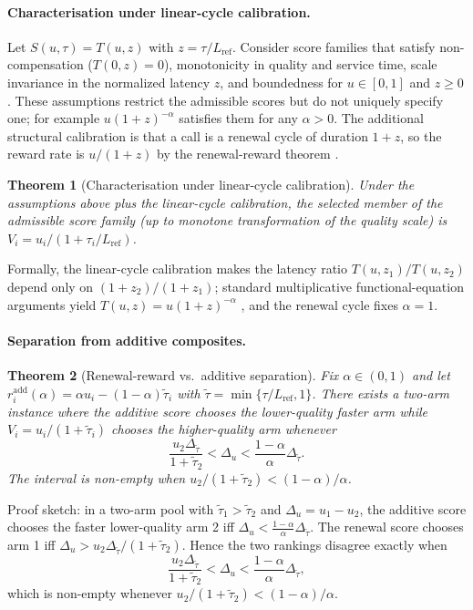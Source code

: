 \documentclass[11pt]{article}
\newtheorem{theorem}{Theorem}
\begin{document}
\paragraph{Characterisation under linear-cycle calibration.} Let $S(u,\tau)=T(u,z)$ with $z=\tau/L_{\text{ref}}$. Consider score families that satisfy non-compensation ($T(0,z)=0$), monotonicity in quality and service time, scale invariance in the normalized latency $z$, and boundedness for $u\in[0,1]$ and $z\ge0$. These assumptions restrict the admissible scores but do not uniquely specify one; for example $u(1+z)^{-\alpha}$ satisfies them for any $\alpha>0$. The additional structural calibration is that a call is a renewal cycle of duration $1+z$, so the reward rate is $u/(1+z)$ by the renewal-reward theorem \citep[Thm.\ 3.6.1]{ross1996stochastic}.
\begin{theorem}[Characterisation under linear-cycle calibration]
\label{thm:characterisation}
Under the assumptions above plus the linear-cycle calibration, the selected member of the admissible score family (up to monotone transformation of the quality scale) is
$V_i=u_i/(1+\tau_i/L_{\text{ref}})$.
\end{theorem}
Formally, the linear-cycle calibration makes the latency ratio $T(u,z_1)/T(u,z_2)$ depend only on $(1+z_2)/(1+z_1)$; standard multiplicative functional-equation arguments yield $T(u,z)=u(1+z)^{-\alpha}$ \citep[Ch.\ 3]{aczel1966functional}, and the renewal cycle fixes $\alpha=1$.

\paragraph{Separation from additive composites.}
\begin{theorem}[Renewal-reward vs.\ additive separation]
\label{thm:separation}
Fix $\alpha\in(0,1)$ and let
$r_i^{\mathrm{add}}(\alpha)=\alpha u_i-(1-\alpha)\tilde\tau_i$ with
$\tilde\tau=\min\{\tau/L_{\text{ref}},1\}$. There exists a two-arm
instance where the additive score chooses the lower-quality faster arm
while $V_i=u_i/(1+\tilde\tau_i)$ chooses the higher-quality arm whenever
\[
\frac{u_2\Delta_{\tilde\tau}}{1+\tilde\tau_2}
< \Delta_u <
\frac{1-\alpha}{\alpha}\Delta_{\tilde\tau}.
\]
The interval is non-empty when
$u_2/(1+\tilde\tau_2)<(1-\alpha)/\alpha$.
\end{theorem}
Proof sketch: in a two-arm pool with $\tilde\tau_1>\tilde\tau_2$ and $\Delta_u=u_1-u_2$, the additive score chooses the faster lower-quality arm 2 iff $\Delta_u < \frac{1-\alpha}{\alpha}\Delta_{\tilde\tau}$. The renewal score chooses arm 1 iff $\Delta_u > u_2\Delta_{\tilde\tau}/(1+\tilde\tau_2)$. Hence the two rankings disagree exactly when
\[
\frac{u_2\Delta_{\tilde\tau}}{1+\tilde\tau_2}
< \Delta_u <
\frac{1-\alpha}{\alpha}\Delta_{\tilde\tau},
\]
which is non-empty whenever $u_2/(1+\tilde\tau_2)<(1-\alpha)/\alpha$.
\end{document}
